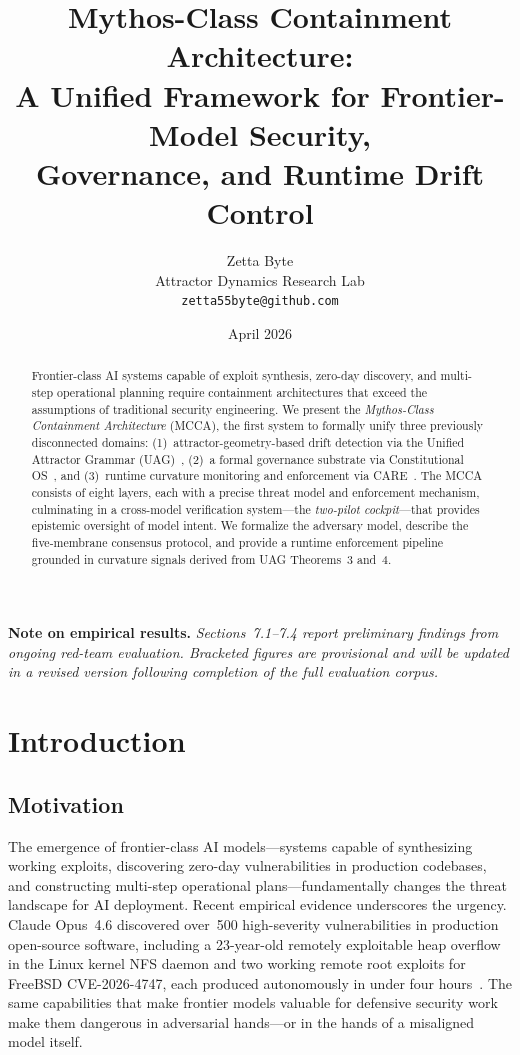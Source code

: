 \documentclass[11pt]{article}
\title{Mythos-Class Containment Architecture:\\
A Unified Framework for Frontier-Model Security,\\
Governance, and Runtime Drift Control}
\author{Zetta Byte\\
Attractor Dynamics Research Lab\\
\texttt{zetta55byte@github.com}}
\date{April 2026}
\begin{document}
\maketitle

\begin{abstract}
Frontier-class AI systems capable of exploit synthesis, zero-day discovery,
and multi-step operational planning require containment architectures that
exceed the assumptions of traditional security engineering.
We present the \emph{Mythos-Class Containment Architecture} (MCCA), the
first system to formally unify three previously disconnected domains:
(1)~attractor-geometry-based drift detection via the Unified Attractor
Grammar (UAG)~\cite{byte2026uag},
(2)~a formal governance substrate via Constitutional
OS~\cite{byte2026cos}, and
(3)~runtime curvature monitoring and enforcement via
CARE~\cite{byte2026care}.
The MCCA consists of eight layers, each with a precise threat model and
enforcement mechanism, culminating in a cross-model verification
system---the \emph{two-pilot cockpit}---that provides epistemic oversight
of model intent.
We formalize the adversary model, describe the five-membrane consensus
protocol, and provide a runtime enforcement pipeline grounded in curvature
signals derived from UAG Theorems~3 and~4.
\end{abstract}

\textbf{Note on empirical results.}
\emph{Sections~7.1--7.4 report preliminary findings from ongoing red-team
evaluation.
Bracketed figures are provisional and will be updated in a revised version
following completion of the full evaluation corpus.}

\section{Introduction}

\subsection{Motivation}

The emergence of frontier-class AI models---systems capable of synthesizing
working exploits, discovering zero-day vulnerabilities in production
codebases, and constructing multi-step operational plans---fundamentally
changes the threat landscape for AI deployment.
Recent empirical evidence underscores the urgency.
Claude Opus~4.6 discovered over~500 high-severity vulnerabilities in
production open-source software, including a 23-year-old remotely
exploitable heap overflow in the Linux kernel NFS daemon and two working
remote root exploits for FreeBSD CVE-2026-4747, each produced autonomously
in under four hours~\cite{carlini2026llm}.
The same capabilities that make frontier models valuable for defensive
security work make them dangerous in adversarial hands---or in the hands of
a misaligned model itself.
\end{document}
